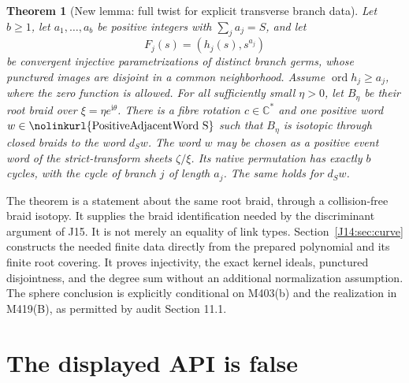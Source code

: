 \documentclass[11pt,oneside]{report}
\newtheorem{theorem}{Theorem}[section]
\theoremstyle{definition}
\numberwithin{equation}{section}
\newcommand{\C}{\mathbb C}
\newcommand{\decl}[1]{\textnormal{\nolinkurl{#1}}}
\newcommand{\ord}{\operatorname{ord}}
\newcommand{\ii}{\mathrm i}
\begin{document}
\begin{theorem}[New lemma: full twist for explicit transverse branch data]
\label{J14:thm:factorization}
Let $b\geq1$, let $a_1,\ldots,a_b$ be positive integers with
$\sum_j a_j=S$, and let
\[
 F_j(s)=(h_j(s),s^{a_j})
\]
be convergent injective parametrizations of distinct branch germs, whose
punctured images are disjoint in a common neighborhood. Assume
$\ord h_j\geq a_j$, where the zero function is allowed. For all sufficiently
small $\eta>0$, let $B_\eta$ be their root braid over $\xi=\eta e^{\ii\theta}$.
There is a fibre rotation $c\in\C^*$ and one positive word
$w\in\decl{PositiveAdjacentWord S}$ such that $B_\eta$ is isotopic through
closed braids to the word $d_Sw$. The word $w$ may be chosen as a positive
event word of the strict-transform sheets $\zeta/\xi$.
Its native permutation has exactly $b$ cycles, with the cycle of branch $j$
of length $a_j$. The same holds for $d_Sw$.
\end{theorem}

The theorem is a statement about the same root braid, through a
collision-free braid isotopy. It supplies the braid identification needed by
the discriminant argument of J15. It is not merely an equality of link types.
Section~\ref{J14:sec:curve} constructs the needed finite data directly from
the prepared polynomial and its finite root covering. It proves injectivity,
the exact kernel ideals, punctured disjointness, and the degree sum without
an additional normalization assumption. The sphere conclusion is explicitly conditional on M403(b) and
the realization in M419(B), as permitted by audit Section 11.1.

\section{The displayed API is false}
\end{document}
